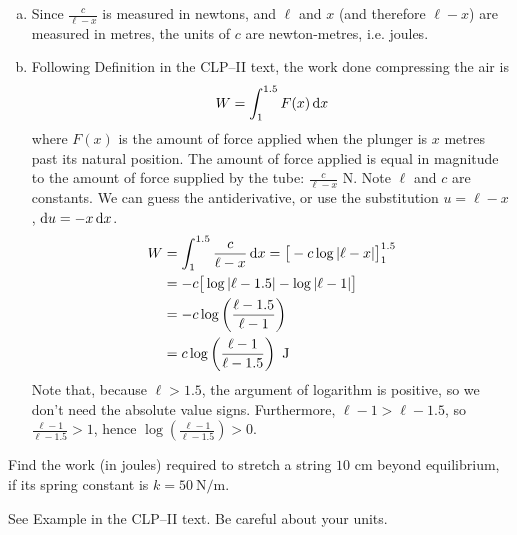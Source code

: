 \begin{solution}
\begin{enumerate}[(a)]
\item Since $\frac{c}{\ell-x}$ is measured in newtons, and $\ell$ and $x$ (and therefore $\ell-x$) are measured in metres, the units of $c$ are newton-metres, i.e. joules.
\item Following Definition  in the CLP--II text, the work done compressing the air is
\[W = \int_1^{1.5}F(x)\,\mathrm{d}x\]
where $F(x)$ is the amount of force applied when the plunger is $x$ metres past its natural position. The amount of force applied is equal in magnitude to the amount of force supplied by the tube: $\frac{c}{\ell-x}$ N. Note $\ell$ and $c$ are constants. We can guess the antiderivative, or use the substitution $u=\ell-x$, $\mathrm{d}u=-x\,\mathrm{d}x$.
\begin{align*}
W &=\int_1^{1.5} \frac{c}{\ell-x}\,\mathrm{d}x  = \big[-c\log|\ell-x|\big]_1^{1.5}\\
&=-c\big[\log|\ell-1.5| - \log|\ell-1|\big]\\
&=-c\log\left(\frac{\ell-1.5}{\ell-1}\right)\\
&=c\log\left(\frac{\ell-1}{\ell-1.5}\right)\text{ J}\end{align*}
Note that, because $\ell>1.5$, the argument of logarithm is positive, so we don't need the absolute value signs. Furthermore, $\ell-1 > \ell-1.5$, so $\frac{\ell-1}{\ell-1.5}>1$, hence $\log\left(\frac{\ell-1}{\ell-1.5}\right)>0$.
\end{enumerate}
\end{solution}





\begin{question}[2016Q3]\label{prob_s2.1:normal1}
Find the work (in joules) required to stretch a string $10$ cm beyond
equilibrium, if its spring constant is $k=50\ \mathrm{N}/\mathrm{m}$.
\end{question}

\begin{hint}
See Example  in the
CLP--II text. Be careful about your units.
\end{hint}

